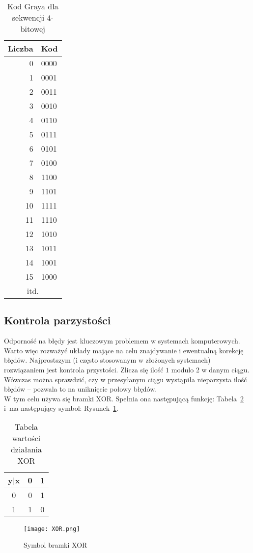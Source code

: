 \documentclass[12pt]{mwart}
\begin{document}
\begin{table}[hbt!]
\begin{center}
\begin{tabular}{r | l}
  Liczba  & Kod \\
  \hline
		0	&	0000 \\
		1 & 0001 \\
		2 & 0011 \\
		3 & 0010 \\
		4 & 0110 \\
		5 & 0111 \\
		6 & 0101 \\
		7 & 0100 \\
		8 & 1100 \\
		9 & 1101 \\
		10 & 1111 \\
		11 & 1110 \\
		12 & 1010 \\
		13 & 1011 \\
		14 & 1001 \\
		15 & 1000 \\
  \hline
  \multicolumn{2}{|c|}{itd.} \\
  \hline
\end{tabular}
\caption{Kod Graya dla sekwencji 4-bitowej}
\label{T2}
\end{center}
\end{table}

\subsection{Kontrola parzystości}
Odporność na błędy jest kluczowym problemem w systemach komputerowych. Warto więc rozważyć układy mające na celu znajdywanie i ewentualną korekcję błędów. Najprostszym (i często stosowanym w złożonych systemach) rozwiązaniem jest kontrola przystości. Zlicza się ilość $1$ modulo 2 w danym ciągu. Wówczas można sprawdzić, czy w przesyłanym ciągu wystąpiła nieparzysta ilość błędów -- pozwala to na uniknięcie połowy błędów. \\
\indent W tym celu używa się bramki XOR. Spełnia ona następującą funkcję: Tabela~\ref{T3} i~ma następujący symbol: Rysunek~\ref{F1}.
\begin{table}[hbt!]
\begin{center}
  \begin{tabular}{c | c | c}
    y|x & 0 & 1 \\
    \hline
    0   & 0 & 1 \\ 
    1   & 1 & 0 \\
  \end{tabular}
  \caption{Tabela wartości działania XOR}
  \label{T3}
\end{center}
\end{table}
\begin{figure}[hbt!]
\begin{center}
  \texttt{[image: XOR.png]}
  \caption{Symbol bramki XOR}
  \label{F1}
\end{center}
\end{figure}
\end{document}
